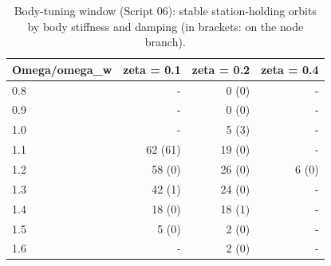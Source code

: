 \begin{table}
\caption{Body-tuning window (Script 06): stable station-holding orbits by body stiffness and damping (in brackets: on the node branch).}
\label{tab:T4_body_tuning}
\begin{ruledtabular}
\begin{tabular}{lrrr}
Omega/omega\_w & zeta = 0.1 & zeta = 0.2 & zeta = 0.4 \\
\hline
0.8 & - & 0 (0) & - \\
0.9 & - & 0 (0) & - \\
1.0 & - & 5 (3) & - \\
1.1 & 62 (61) & 19 (0) & - \\
1.2 & 58 (0) & 26 (0) & 6 (0) \\
1.3 & 42 (1) & 24 (0) & - \\
1.4 & 18 (0) & 18 (1) & - \\
1.5 & 5 (0) & 2 (0) & - \\
1.6 & - & 2 (0) & - \\
\end{tabular}
\end{ruledtabular}
\end{table}